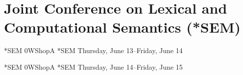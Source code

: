 \chapter{Joint Conference on Lexical and Computational Semantics (*SEM)}
\thispagestyle{emptyheader}

\cleardoublepage

\clearpage


\clearpage
\begin{wsschedule}
{*SEM}
{0}{WShopA}
{*SEM}
{Thursday, June 13--Friday, June 14}{\WShopLocA}

\end{wsschedule}

\clearpage
\begin{wsschedule}
{*SEM}
{0}{WShopA}
{*SEM}
{Thursday, June 14--Friday, June 15}{\WShopLocA}

\end{wsschedule}
